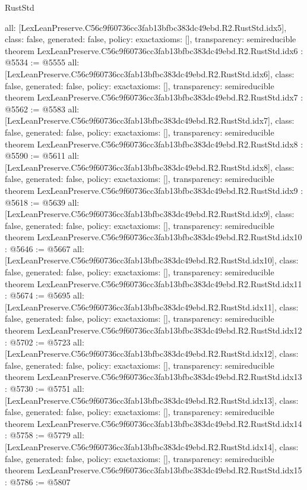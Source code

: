 \begin{lexlean}{RustStd}
\begin{coremodule}
{  all: [LexLeanPreserve.C56c9f60736cc3fab13bfbc383dc49ebd.R2.RustStd.idx5],
  class: false,
  generated: false,
  policy: exact{axioms: []},
  transparency: semireducible
}
theorem LexLeanPreserve.C56c9f60736cc3fab13bfbc383dc49ebd.R2.RustStd.idx6 : @5534 := @5555 {
  all: [LexLeanPreserve.C56c9f60736cc3fab13bfbc383dc49ebd.R2.RustStd.idx6],
  class: false,
  generated: false,
  policy: exact{axioms: []},
  transparency: semireducible
}
theorem LexLeanPreserve.C56c9f60736cc3fab13bfbc383dc49ebd.R2.RustStd.idx7 : @5562 := @5583 {
  all: [LexLeanPreserve.C56c9f60736cc3fab13bfbc383dc49ebd.R2.RustStd.idx7],
  class: false,
  generated: false,
  policy: exact{axioms: []},
  transparency: semireducible
}
theorem LexLeanPreserve.C56c9f60736cc3fab13bfbc383dc49ebd.R2.RustStd.idx8 : @5590 := @5611 {
  all: [LexLeanPreserve.C56c9f60736cc3fab13bfbc383dc49ebd.R2.RustStd.idx8],
  class: false,
  generated: false,
  policy: exact{axioms: []},
  transparency: semireducible
}
theorem LexLeanPreserve.C56c9f60736cc3fab13bfbc383dc49ebd.R2.RustStd.idx9 : @5618 := @5639 {
  all: [LexLeanPreserve.C56c9f60736cc3fab13bfbc383dc49ebd.R2.RustStd.idx9],
  class: false,
  generated: false,
  policy: exact{axioms: []},
  transparency: semireducible
}
theorem LexLeanPreserve.C56c9f60736cc3fab13bfbc383dc49ebd.R2.RustStd.idx10 : @5646 := @5667 {
  all: [LexLeanPreserve.C56c9f60736cc3fab13bfbc383dc49ebd.R2.RustStd.idx10],
  class: false,
  generated: false,
  policy: exact{axioms: []},
  transparency: semireducible
}
theorem LexLeanPreserve.C56c9f60736cc3fab13bfbc383dc49ebd.R2.RustStd.idx11 : @5674 := @5695 {
  all: [LexLeanPreserve.C56c9f60736cc3fab13bfbc383dc49ebd.R2.RustStd.idx11],
  class: false,
  generated: false,
  policy: exact{axioms: []},
  transparency: semireducible
}
theorem LexLeanPreserve.C56c9f60736cc3fab13bfbc383dc49ebd.R2.RustStd.idx12 : @5702 := @5723 {
  all: [LexLeanPreserve.C56c9f60736cc3fab13bfbc383dc49ebd.R2.RustStd.idx12],
  class: false,
  generated: false,
  policy: exact{axioms: []},
  transparency: semireducible
}
theorem LexLeanPreserve.C56c9f60736cc3fab13bfbc383dc49ebd.R2.RustStd.idx13 : @5730 := @5751 {
  all: [LexLeanPreserve.C56c9f60736cc3fab13bfbc383dc49ebd.R2.RustStd.idx13],
  class: false,
  generated: false,
  policy: exact{axioms: []},
  transparency: semireducible
}
theorem LexLeanPreserve.C56c9f60736cc3fab13bfbc383dc49ebd.R2.RustStd.idx14 : @5758 := @5779 {
  all: [LexLeanPreserve.C56c9f60736cc3fab13bfbc383dc49ebd.R2.RustStd.idx14],
  class: false,
  generated: false,
  policy: exact{axioms: []},
  transparency: semireducible
}
theorem LexLeanPreserve.C56c9f60736cc3fab13bfbc383dc49ebd.R2.RustStd.idx15 : @5786 := @5807 {
}
\end{coremodule}
\end{lexlean}
